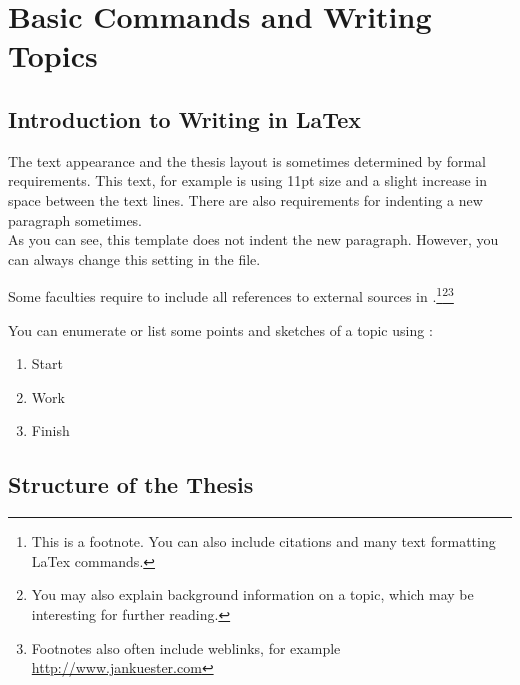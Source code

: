 %
%
\section{Basic Commands and Writing Topics}


\subsection{Introduction to Writing in LaTex}

The text appearance and the thesis layout is sometimes determined by formal requirements. This text, for example is  using 11pt size and a slight increase in space between the text lines. There are also requirements for indenting a new paragraph sometimes.\\
As you can see, this template does not indent the new paragraph. However, you can always change this setting in the  file.\\
\ThinHRule

Some faculties require to include all references to external sources in .\footnote{ This is a footnote. You can also include citations and many text formatting LaTex commands.}\footnote{ You may also explain background information on a topic, which may be interesting for further reading.}\footnote{ Footnotes also often include weblinks, for example \url{http://www.jankuester.com}}\\
\ThinHRule

You can enumerate or list some points and sketches of a topic using :

\begin{enumerate}
	\item Start
	\item Work
	\item Finish
\end{enumerate}


\subsection{Structure of the Thesis}

